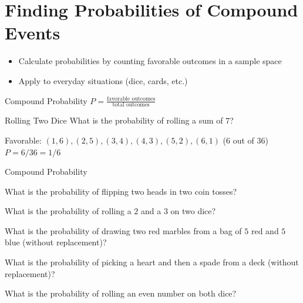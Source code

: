\section{Finding Probabilities of Compound Events}

\begin{learningGoals}
\begin{itemize}
    \item Calculate probabilities by counting favorable outcomes in a sample space
    \item Apply to everyday situations (dice, cards, etc.)
\end{itemize}
\end{learningGoals}

\begin{conceptBox}{Compound Probability}
$P = \frac{\text{favorable outcomes}}{\text{total outcomes}}$
\end{conceptBox}

\begin{workedExample}{Rolling Two Dice}
What is the probability of rolling a sum of $7$?

Favorable: $(1,6), (2,5), (3,4), (4,3), (5,2), (6,1)$ ($6$ out of $36$)
$P = 6/36 = 1/6$
\end{workedExample}


\begin{practiceBox}{Compound Probability}
\resetProblems

\prob What is the probability of flipping two heads in two coin tosses?

\prob What is the probability of rolling a $2$ and a $3$ on two dice?

\prob What is the probability of drawing two red marbles from a bag of $5$ red and $5$ blue (without replacement)?

\prob What is the probability of picking a heart and then a spade from a deck (without replacement)?

\prob What is the probability of rolling an even number on both dice?

\end{practiceBox}
